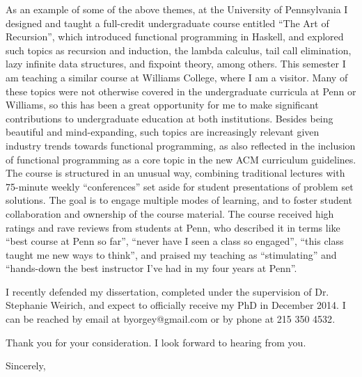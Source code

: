 \begin{letter}{\thereaddress}
{  As an example of some of the above themes, at the University of
  Pennsylvania I designed and taught a full-credit undergraduate
  course entitled ``The Art of Recursion'', which introduced
  functional programming in Haskell, and explored such topics as
  recursion and induction, the lambda calculus, tail call elimination,
  lazy infinite data structures, and fixpoint theory, among others.
  This semester I am teaching a similar course at Williams College,
  where I am a visitor.  Many of these topics were not otherwise
  covered in the undergraduate curricula at Penn or Williams, so this
  has been a great opportunity for me to make significant
  contributions to undergraduate education at both institutions.
  Besides being beautiful and mind-expanding, such topics are
  increasingly relevant given industry trends towards functional
  programming, as also reflected in the inclusion of functional
  programming as a core topic in the new ACM curriculum guidelines.
  The course is structured in an unusual way, combining traditional
  lectures with 75-minute weekly ``conferences'' set aside for student
  presentations of problem set solutions.  The goal is to engage
  multiple modes of learning, and to foster student collaboration and
  ownership of the course material. The course received high ratings
  and rave reviews from students at Penn, who described it in terms
  like ``best course at Penn so far'', ``never have I seen a class so
  engaged'', ``this class taught me new ways to think'', and praised
  my teaching as ``stimulating'' and ``hands-down the best instructor
  I've had in my four years at Penn''.

} %

\placespecific

I recently defended my dissertation, completed under the supervision
of Dr. Stephanie Weirich, and expect to officially receive my PhD in
December 2014.  I can be reached by email at
\textsf{byorgey@gmail.com} or by phone at \textsf{215 350 4532}.

Thank you for your consideration.  I look forward to hearing from you.

\closing{Sincerely,}

\end{letter}


